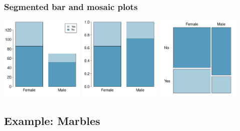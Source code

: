 \begin{frame}
\frametitle{Segmented bar and mosaic plots}


\begin{center}
\includegraphics[width=0.30\textwidth]{1-7_categorical_data/figures/gender_spouse/gender_seg_bar}
\includegraphics[width=0.30\textwidth]{1-7_categorical_data/figures/gender_spouse/gender_rel_seg_bar}
\includegraphics[width=0.30\textwidth]{1-7_categorical_data/figures/gender_spouse/gender_mosaic}
\end{center}

\end{frame}





\subsection{Example: Marbles}


